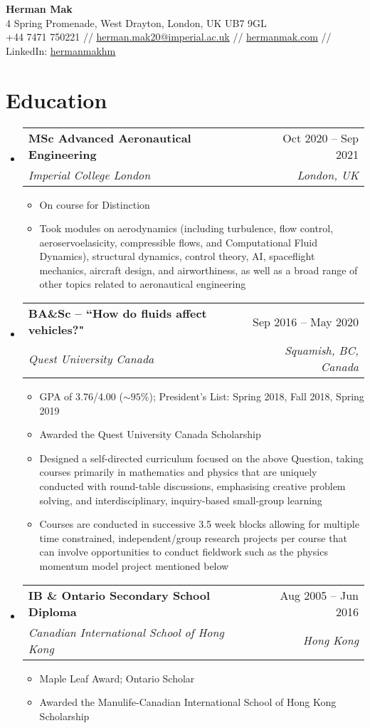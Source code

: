 \documentclass[a4paper,11pt]{article}
\makeatletter
\newcommand{\resumeItem}[1]{
  \item\small{
    {#1\vspace{-2pt}}
  }
}
\newcommand{\resumeSubheading}[4]{
  \vspace{-2pt}\item
    \begin{tabular*}{0.97\textwidth}[t]{l@{\extracolsep{\fill}}r}
      \textbf{#1} & #2 \\
      \textit{\small#3} & \textit{\small #4} \\
    \end{tabular*}\vspace{-7pt}
}
\newcommand{\resumeSubHeadingListStart}{\begin{itemize}[leftmargin=0.15in, label={}]}
\newcommand{\resumeSubHeadingListEnd}{\end{itemize}}
\newcommand{\resumeItemListStart}{\begin{itemize}}
\newcommand{\resumeItemListEnd}{\end{itemize}\vspace{-5pt}}
\makeatother
\begin{document}
\begin{center}
    \textbf{\Large Herman Mak} \\ \vspace{1pt}
    4 Spring Promenade, West Drayton, London, UK UB7 9GL\\
    \small +44 7471 750221 // \href{mailto:herman.mak20@imperial.ac.uk}{\underline{herman.mak20@imperial.ac.uk}} //
\href{https://hermanmak.com/}{\underline{hermanmak.com}} //
    LinkedIn: \href{https://www.linkedin.com/in/hermanmakhm/}{\underline{hermanmakhm}}
\end{center}

\section{Education}
  \resumeSubHeadingListStart
    \resumeSubheading
      {MSc Advanced Aeronautical Engineering}{Oct 2020 -- Sep 2021}
      {Imperial College London}{London, UK}
        \resumeItemListStart
        \resumeItem{On course for Distinction}
        \resumeItem{Took modules on aerodynamics (including turbulence, flow control, aeroservoelasicity, compressible flows, and Computational Fluid Dynamics), structural dynamics, control theory, AI, spaceflight mechanics, aircraft design, and airworthiness, as well as a broad range of other topics related to aeronautical engineering} 
      \resumeItemListEnd
    \resumeSubheading
      {BA\&Sc -- ``How do fluids affect vehicles?"}{Sep 2016 -- May 2020}
      {Quest University Canada}{Squamish, BC, Canada}
      \resumeItemListStart
      	\resumeItem{GPA of 3.76/4.00 ($\sim95$\%); President's List: Spring 2018, Fall 2018, Spring 2019}
      	\resumeItem{Awarded the Quest University Canada Scholarship}
        \resumeItem{Designed a self-directed curriculum focused on the above Question, taking courses primarily in mathematics and physics that are uniquely conducted with round-table discussions, emphasising creative problem solving, and interdisciplinary, inquiry-based small-group learning}
        \resumeItem{Courses are conducted in successive 3.5 week blocks allowing for multiple time constrained, independent/group research projects per course that can involve opportunities to conduct fieldwork such as the physics momentum model project mentioned below}
      \resumeItemListEnd
    \resumeSubheading
      {IB \& Ontario Secondary School Diploma}{Aug 2005 -- Jun 2016}
      {Canadian International School of Hong Kong}{Hong Kong}
      \resumeItemListStart
        \resumeItem{Maple Leaf Award; Ontario Scholar}
        \resumeItem{Awarded the Manulife-Canadian International School of Hong Kong Scholarship}
      \resumeItemListEnd
  \resumeSubHeadingListEnd
\end{document}
